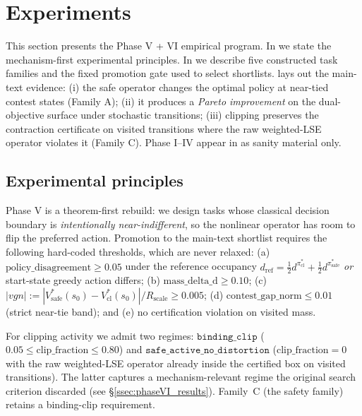 
\section{Experiments}
\label{sec:experiments}

This section presents the Phase V + VI empirical program. In
 we state the mechanism-first experimental
principles. In  we describe five constructed
task families and the fixed promotion gate used to select shortlists.
 lays out the main-text evidence:
(i) the safe operator changes the optimal policy at near-tied contest
states (Family A); (ii) it produces a \emph{Pareto improvement} on the
dual-objective surface under stochastic transitions; (iii) clipping
preserves the contraction certificate on visited transitions where the
raw weighted-LSE operator violates it (Family C). Phase I--IV appear in
 as sanity material only.

\subsection{Experimental principles}
\label{ssec:phaseVI_design}

Phase V is a theorem-first rebuild: we design tasks whose classical
decision boundary is \emph{intentionally near-indifferent}, so the
nonlinear operator has room to flip the preferred action. Promotion to
the main-text shortlist requires the following hard-coded thresholds,
which are never relaxed:
(a) $\mathrm{policy\_disagreement} \geq 0.05$ under the reference
occupancy $d_\mathrm{ref} = \tfrac12 d^{\pi^*_\mathrm{cl}} + \tfrac12 d^{\pi^*_\mathrm{safe}}$
\emph{or} start-state greedy action differs;
(b) $\mathrm{mass\_delta\_d} \geq 0.10$;
(c) $|vgn| := |V^*_\mathrm{safe}(s_0) - V^*_\mathrm{cl}(s_0)|/R_\mathrm{scale} \geq 0.005$;
(d) $\mathrm{contest\_gap\_norm} \leq 0.01$ (strict near-tie band); and
(e) no certification violation on visited mass.

For clipping activity we admit two regimes: $\texttt{binding\_clip}$
($0.05 \leq \mathrm{clip\_fraction} \leq 0.80$) and
$\texttt{safe\_active\_no\_distortion}$ ($\mathrm{clip\_fraction}=0$ with
the raw weighted-LSE operator already inside the certified box on
visited transitions). The latter captures a mechanism-relevant regime
the original search criterion discarded (see \S\ref{ssec:phaseVI_results}).
Family~C (the safety family) retains a binding-clip requirement.

